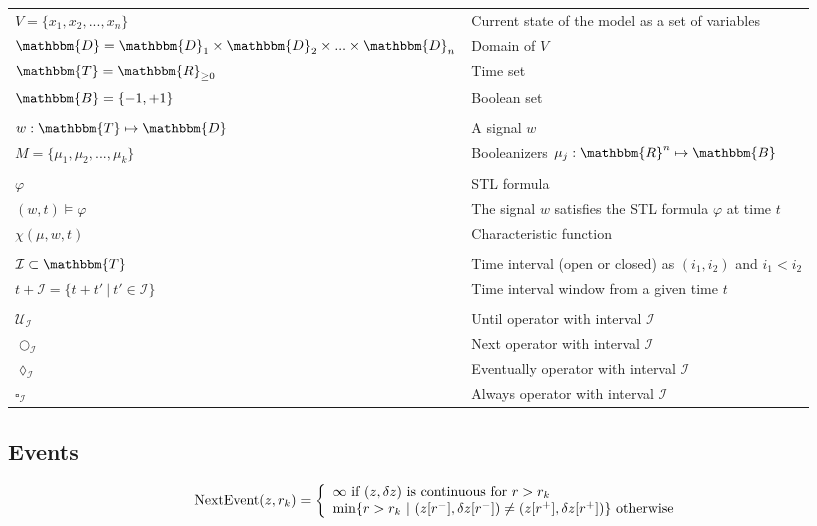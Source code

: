 \documentclass[a4paper]{article}
\begin{document}
\begin{center}
\begin{tabular}{ m{15em}  m{22em} } 
$V = \{x_1, x_2, ... , x_n\}$ & Current state of the model as a set of variables \\
$\mathbbm{D} = \mathbbm{D}_1 \times \mathbbm{D}_2 \times ... \times \mathbbm{D}_n$ & Domain of $V$ \\
$\mathbbm{T} = \mathbbm{R}_{\geq 0}$ & Time set\\
$\mathbbm{B} = \{-1, +1\}$ & Boolean set \\
\\
$w: \mathbbm{T} \mapsto \mathbbm{D}$ & A signal $w$\\
$M = \{\mu_1, \mu_2, ... , \mu_k\}$ & Booleanizers $\mu_j: \mathbbm{R}^n \mapsto \mathbbm{B}$\\
\\
$\varphi$ & STL formula \\
$(w, t) \models \varphi$ & The signal $w$ satisfies the STL formula $\varphi$ at time $t$\\
$\chi(\mu, w, t)$ & Characteristic function\\
\\
$\mathcal{I} \subset \mathbbm{T}$ & Time interval (open or closed) as $(i_1, i_2)$ and $i_1 < i_2$\\
$t + \mathcal{I} = \{t + t'\ |\ t' \in \mathcal{I}\}$ & Time interval window from a given time $t$\\
\\
$\mathcal{U}_\mathcal{I}$ & Until operator with interval $\mathcal{I}$\\
$\bigcirc_\mathcal{I}$ & Next operator with interval $\mathcal{I}$\\
$\lozenge_\mathcal{I}$ & Eventually operator with interval $\mathcal{I}$\\
$\square_\mathcal{I}$ & Always operator with interval $\mathcal{I}$\\
\end{tabular}
\end{center}

\subsection{Events}

\begin{center}
\begin{equation} 
\textnormal{NextEvent}(z,r_k) = \left\{
\begin{array}{ll}
\infty\ \textnormal{if}\ (z, \delta z)\ \textnormal{is continuous for}\ r > r_k \\
\min\{r > r_k\ |\ (z[r^-], \delta z[r^-]) \ne (z[r^+], \delta z[r^+])\}\ \textnormal{otherwise}
\end{array}
\right.
\end{equation} 
\end{center}
\end{document}
